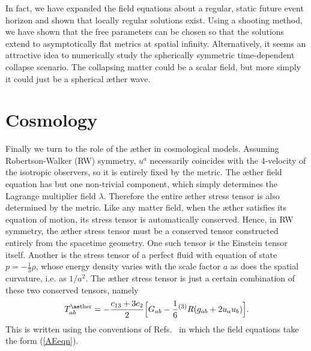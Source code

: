 \documentclass[aps]{ws-procs9x6}
\def\beq{\begin{equation}}
\def\eeq{\end{equation}}
\def\l{\lambda}
\begin{document}
In fact, we have expanded the field equations about a regular,
static future event horizon and shown\cite{ElingJ3} that locally
regular solutions exist.
Using a shooting method, we have shown that
the free parameters can be chosen so that the solutions extend
to asymptotically
flat metrics at spatial infinity.
Alternatively, it
seems an attractive idea to numerically study the spherically
symmetric time-dependent collapse scenario. The collapsing matter
could be a scalar field, but more simply it could just be a
spherical {\ae}ther wave.

\section{Cosmology}

Finally we turn to the role of the {\ae}ther in cosmological
models. Assuming Robertson-Walker (RW) symmetry, $u^a$
necessarily coincides with the 4-velocity of the isotropic
observers, so it is entirely fixed by the metric. The {\ae}ther
field equation has but one non-trivial component, which simply
determines the Lagrange multiplier field $\l$. Therefore the
entire {\ae}ther stress tensor is also determined by the metric.
Like any matter field, when the {\ae}ther satisfies its equation
of motion, its stress tensor is automatically conserved. Hence,
in RW symmetry, the {\ae}ther stress tensor must be a conserved
tensor constructed entirely from the spacetime geometry. One such
tensor is the Einstein tensor itself. Another is the stress
tensor of a perfect fluid with equation of state
$p=-\frac13\rho$, whose energy density varies with the scale
factor $a$ as does the spatial curvature, i.e. as $1/a^2$. The
{\ae}ther stress tensor is just a certain combination of these two
conserved tensors\cite{MJindy,CLim}, namely
%
\beq T^{\rm {\ae}ther}_{ab}= -\frac{c_{13}+3c_2}{2}
\Bigl[G_{ab}-\frac16{}^{(3)}R(g_{ab}+2u_au_b)\Bigr]. \eeq
%
This is written using the conventions of
Refs.~ in which the field
equations take the form (\ref{AEeqn}).
\end{document}
